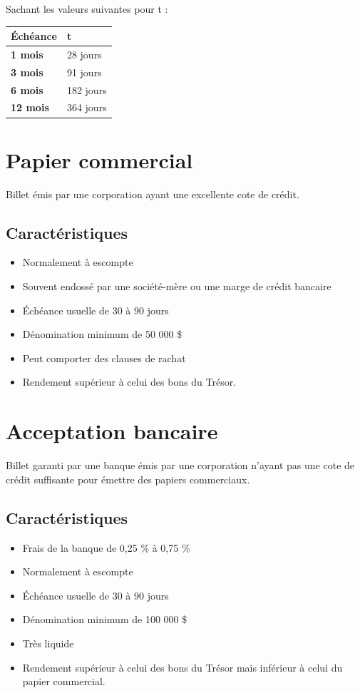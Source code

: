 \documentclass[12pt]{article}
\begin{document}
Sachant les valeurs suivantes pour t :
\begin{table}[H]
\centering
\begin{tabular}{@{}ll@{}}
\toprule
\textbf{Échéance} & \textbf{t} \\ \midrule
\textbf{1 mois}   & 28 jours   \\
\textbf{3 mois}   & 91 jours   \\
\textbf{6 mois}   & 182 jours  \\
\textbf{12 mois}  & 364 jours  \\ \bottomrule
\end{tabular}
\end{table}
\newpage
\section{Papier commercial}
Billet émis par une corporation ayant une excellente cote de crédit.
\subsection{Caractéristiques}
\begin{itemize}
\item Normalement à escompte
\item Souvent endossé par une société-mère ou une marge de crédit bancaire
\item Échéance usuelle de 30 à 90 jours
\item Dénomination minimum de 50 000 \$
\item Peut comporter des clauses de rachat
\item Rendement supérieur à celui des bons du Trésor.
\end{itemize}

\section{Acceptation bancaire}
Billet garanti par une banque émis par une corporation n’ayant pas une cote de crédit suffisante pour émettre des papiers commerciaux.
\subsection{Caractéristiques}
\begin{itemize}
\item Frais de la banque de 0,25 \% à 0,75 \%
\item Normalement à escompte
\item Échéance usuelle de 30 à 90 jours
\item Dénomination minimum de 100 000 \$
\item Très liquide
\item Rendement supérieur à celui des bons du Trésor mais inférieur à celui du papier commercial.
\end{itemize}
\newpage
\end{document}
